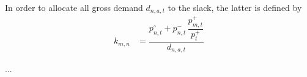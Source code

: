 \documentclass[11pt]{article}
\newcommand{\generationnodal}[1][n]{g_{#1,t}}
\newcommand{\demand}[1][n]{d_{#1,a,t}}
\newcommand{\slack}[1][n]{k_{#1}}
\newcommand{\netconsumption}[1][n]{p^{-}_{#1,t}}
\newcommand{\netproduction}[1][n]{p^{+}_{#1,t}}
\newcommand{\selfconsumption}[1][n]{p^{\circ}_{#1,t}}
\newcommand{\totalnetproduction}{p^{+}_{t}}
\begin{document}
In order to allocate all gross demand $\demand$ to the slack, the latter is defined by 
\begin{align}
\slack[m,n] &= \dfrac{\selfconsumption + \netconsumption  \, \dfrac{\netproduction[m]}{\totalnetproduction}}{\demand}
\end{align}

...



% 



% 
\end{document}
